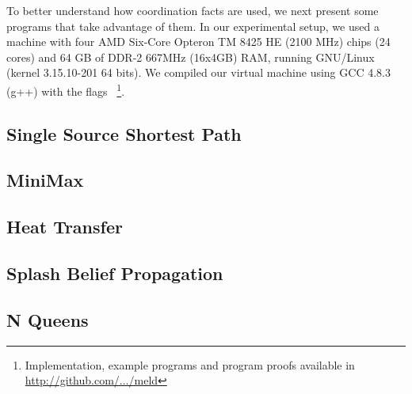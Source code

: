 
To better understand how coordination facts are used, we next present some programs that
take advantage of them. In our experimental setup, we used a machine with
four AMD Six-Core Opteron TM 8425 HE (2100 MHz) chips (24 cores) and 64 GB of
DDR-2 667MHz (16x4GB) RAM, running GNU/Linux (kernel 3.15.10-201 64 bits).
We compiled our virtual machine using GCC 4.8.3 (g++) with the flags
~\footnote{Implementation,
   example programs and program proofs available in \url{http://github.com/.../meld}}.

\subsection{Single Source Shortest Path}


\subsection{MiniMax}


\subsection{Heat Transfer}


\subsection{Splash Belief Propagation}


\subsection{N Queens}

